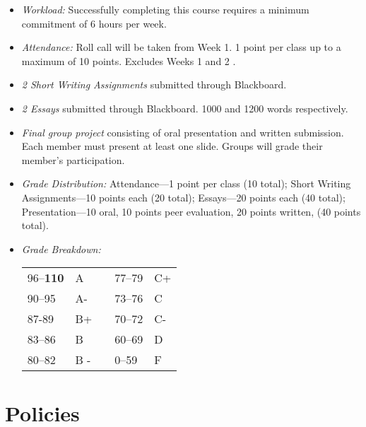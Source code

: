 \documentclass[11pt,article,oneside]{memoir}
\begin{document}
\begin{itemize}
\item \textit{Workload:} Successfully completing this course requires a minimum commitment of 6 hours per week. 

\item \textit{Attendance:} Roll call will be taken from Week 1. 1 point per class up to a maximum of 10 points. Excludes Weeks 1 and 2 .

\item \textit{2 Short Writing Assignments} submitted through Blackboard. 

\item \textit{2 Essays} submitted through Blackboard. 1000 and 1200 words respectively. 

\item \textit{Final group project} consisting of oral presentation and written submission. Each member must present at least one slide. Groups will grade their member's participation. 

\item \textit{Grade Distribution:}  Attendance---1 point per class (10 total);  Short Writing Assignments---10 points each (20 total); Essays---20 points each (40 total); Presentation---10 oral, 10 points peer evaluation, 20 points written, (40 points total).

\item \textit{Grade Breakdown:}

 \begin{tabular}{ | l | l | p{2cm} | l | l | }
    \hline 
96--\textbf{110} & A  & &  77--79 &  C+ \\  
90--95 & A- & &  73--76 & C \\
87-89 & B+ &  &  70--72 & C- \\ 
83--86 & B  & &  60--69 & D\\
80--82 & B - & & 0--59 & F\\ \hline
    \end{tabular}


\end{itemize}




\section{Policies}
\end{document}
